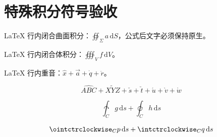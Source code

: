 \documentclass{article}
\begin{document}
\section{特殊积分符号验收}

LaTeX 行内闭合曲面积分：\(\oiint_{\Sigma} a\,\mathrm{d}S\)，公式后文字必须保持原生。

LaTeX 行内闭合体积分：$\oiiint_V f\,\mathrm{d}V$。

LaTeX 行内重音：$\hat{x}+\vec{a}+\dot{q}+\ddot{r}$。

\[
\widehat{ABC}+\widetilde{XYZ}+\check{s}+\breve{t}+\acute{u}+\grave{v}+\mathring{w}
\]

\[
\intclockwise_C g\,\mathrm{d}s+\varointclockwise_C h\,\mathrm{d}s
\]

\begin{equation}
\ointctrclockwise_C p\,\mathrm{d}s+\intctrclockwise_C q\,\mathrm{d}s
\end{equation}
\end{document}
